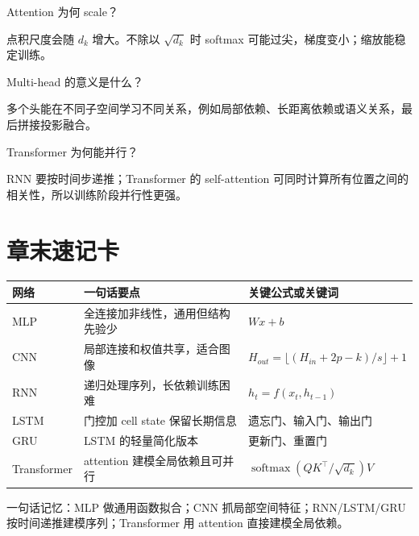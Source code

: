 \begin{interview}
Attention 为何 scale？
\end{interview}

\begin{answer}
点积尺度会随 \(d_k\) 增大。不除以 \(\sqrt{d_k}\) 时 softmax 可能过尖，梯度变小；缩放能稳定训练。
\end{answer}

\begin{interview}
Multi-head 的意义是什么？
\end{interview}

\begin{answer}
多个头能在不同子空间学习不同关系，例如局部依赖、长距离依赖或语义关系，最后拼接投影融合。
\end{answer}

\begin{interview}
Transformer 为何能并行？
\end{interview}

\begin{answer}
RNN 要按时间步递推；Transformer 的 self-attention 可同时计算所有位置之间的相关性，所以训练阶段并行性更强。
\end{answer}

\section{章末速记卡}

\begin{quickcard}
\begin{tabular}{lll}
\toprule
网络 & 一句话要点 & 关键公式或关键词 \\
\midrule
MLP & 全连接加非线性，通用但结构先验少 & \(Wx+b\) \\
CNN & 局部连接和权值共享，适合图像 & \(H_{out}=\lfloor(H_{in}+2p-k)/s\rfloor+1\) \\
RNN & 递归处理序列，长依赖训练困难 & \(h_t=f(x_t,h_{t-1})\) \\
LSTM & 门控加 cell state 保留长期信息 & 遗忘门、输入门、输出门 \\
GRU & LSTM 的轻量简化版本 & 更新门、重置门 \\
Transformer & attention 建模全局依赖且可并行 & \(\operatorname{softmax}(QK^\top/\sqrt{d_k})V\) \\
\bottomrule
\end{tabular}
\end{quickcard}

\begin{quickcard}
一句话记忆：MLP 做通用函数拟合；CNN 抓局部空间特征；RNN/LSTM/GRU 按时间递推建模序列；Transformer 用 attention 直接建模全局依赖。
\end{quickcard}
